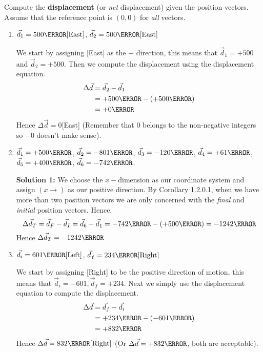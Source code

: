 \documentclass[12pt]{article} %
\newcommand{\tx}[1]{\text{#1}}
\begin{document}
 \begin{qstn}[2]
    Compute the \textbf{displacement} (or \emph{net} displacement) given the position vectors. Assume that the reference point is $(0,0)$ for \emph{all} vectors.
    \begin{enumerate}[label=(\alph*)]
        \item $\vec d_1 = 500 \tx{\m}[\tx{East}]$, $\vec d_2 = 500 \tx{\m}[\tx{East}]$
        

        \begin{soln}
            We start by assigning [East] as the + direction, this means that $\vec d_1 = +500$ and $\vec d_2 = +500$. Then we compute the displacement using the displacement equation. 
            \begin{align*}
                \Delta \vec d &= \vec d_2 - \vec d_1\\
                &= +500\m - (+500\m)\\
                &= +0\km
            \end{align*}
            Hence $\Delta \vec d = 0$[East] (Remember that $0$ belongs to the non-negative integers so $-0$ doesn't make sense).

        \end{soln}



        
        \item $\vec d_1 = +500\km$, $\vec d_2 = -801\km$, $\vec d_3 = -120\km$, $\vec d_4 = +61\km$, $\vec d_5 = +400\km$, $\vec d_6 = -742\km$.

        \begin{soln}
            \textbf{Solution 1: }We choose the $x-$dimension as our coordinate system and assign $(x \rightarrow)$ as our positive direction. By Corollary 1.2.0.1, when we have more than two position vectors we are only concerned with the \emph{final} and \emph{initial} position vectors. Hence,
            $$\Delta \vec d_T = \vec d_F - \vec d_I = \vec d_6 - \vec d_1 = -742\km - (+500\km) = -1242\km$$
            Hence $\Delta \vec d_T = -1242\km$
        \end{soln}



        \item $\vec d_i = 601\tx{\m}[\tx{Left}]$, $\vec d_f = 234\tx{\m}[\tx{Right}]$


        \begin{soln}
            We start by assigning [Right] to be the positive direction of motion, this means that $\vec d_i = -601, \vec d_f = +234$. Next we simply use the displacement equation to compute the displacement.
            \begin{align*}
                \Delta \vec d &= \vec d_f - \vec d_i\\
                &= +234\m - (-601\m)\\
                &= +832\m
            \end{align*}
            Hence $\Delta \vec d = 832\m[\tx{Right}]$ (Or $\Delta \vec d = +832\m$, both are acceptable).
        \end{soln}
        



\end{enumerate}
\end{qstn}
\end{document}
